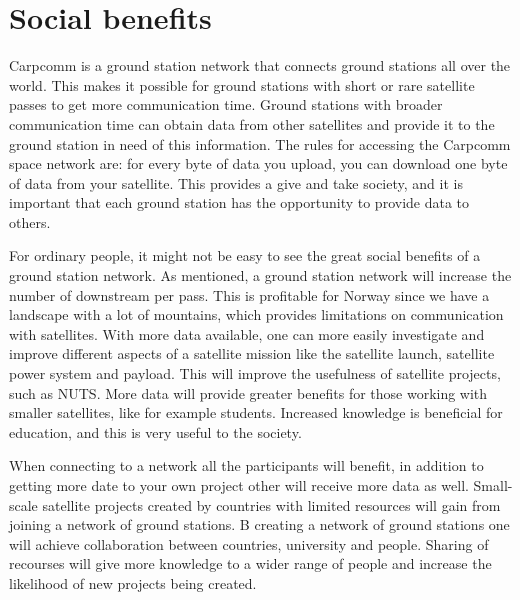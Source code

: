 \section{Social benefits}


Carpcomm is a ground station network that connects ground stations all over the world. This makes it possible for ground stations with short or rare satellite passes to get more communication time. Ground stations with broader communication time can obtain data from other satellites and provide it to the ground station in need of this information. The rules for accessing the Carpcomm space network are: for every byte of data you upload, you can download one byte of data from your satellite. This provides a give and take society, and it is important that each ground station has the opportunity to provide data to others. 

For ordinary people, it might not be easy to see the great social benefits of a ground station network. As mentioned, a ground station network will increase the number of downstream per pass. This is profitable for Norway since we have a landscape with a lot of mountains, which provides limitations on communication with satellites. With more data available, one can more easily investigate and improve different aspects of a satellite mission like the satellite launch, satellite power system and payload. This will improve the usefulness of satellite projects, such as NUTS. More data will provide greater benefits for those working with smaller satellites, like for example students. Increased knowledge is beneficial for education, and this is very useful to the society. 

When connecting to a network all the participants will benefit, in addition to getting more date to your own project other will receive more data as well. Small-scale satellite projects created by countries with limited resources will gain from joining a network of ground stations. B creating a network of ground stations one will achieve collaboration between countries, university and people. 
Sharing of recourses will give more knowledge to a wider range of people and increase the likelihood of new projects being created. 

